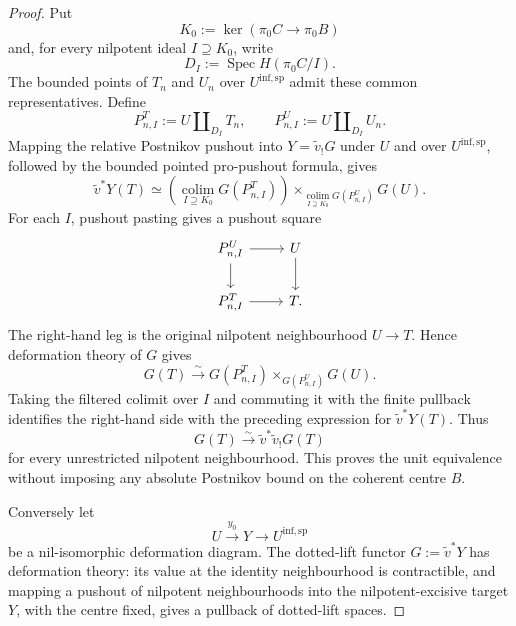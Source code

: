 \begin{proof}
Put
\[
    K_0:=\ker(\pi_0C\to\pi_0B)
\]
and, for every nilpotent ideal
$I\supseteq K_0$, write
\[
    D_I:=\operatorname{Spec}H(\pi_0C/I).
\]
The bounded points of $T_n$ and $U_n$ over $U^{\mathrm{inf,sp}}$ admit these
common representatives.  Define
\[
    P^T_{n,I}:=U\amalg_{D_I}T_n,
    \qquad
    P^U_{n,I}:=U\amalg_{D_I}U_n.
\]
Mapping the relative Postnikov pushout into $Y=\widetilde v_!G$ under $U$
and over $U^{\mathrm{inf,sp}}$, followed by the bounded pointed
pro-pushout formula, gives
\[
\widetilde v^*Y(T)
\simeq
\left(
  \operatorname*{colim}_{I\supseteq K_0}G(P^T_{n,I})
\right)
\times_{
  \operatorname*{colim}_{I\supseteq K_0}G(P^U_{n,I})
}
G(U).
\]
For each $I$, pushout pasting gives a pushout square
\[
\begin{tikzcd}
P^U_{n,I} \arrow[r] \arrow[d] &
U \arrow[d]\\
P^T_{n,I} \arrow[r] &
T.
\end{tikzcd}
\]
The right-hand leg is the original nilpotent neighbourhood
$U\to T$.  Hence deformation theory of $G$ gives
\[
    G(T)
    \xrightarrow{\sim}
    G(P^T_{n,I})
    \times_{G(P^U_{n,I})}
    G(U).
\]
Taking the filtered colimit over $I$ and commuting it with the finite
pullback identifies the right-hand side with the preceding expression for
$\widetilde v^*Y(T)$.  Thus
\[
\boxed{
    G(T)
    \xrightarrow{\sim}
    \widetilde v^*\widetilde v_!G(T)}
\]
for every unrestricted nilpotent neighbourhood.  This proves the unit
equivalence without imposing any absolute Postnikov bound on the coherent
centre $B$.

Conversely let
\[
    U\xrightarrow{y_0}Y\longrightarrow U^{\mathrm{inf,sp}}
\]
be a nil-isomorphic deformation diagram.  The dotted-lift functor
$G:=\widetilde v^*Y$ has deformation theory: its value at the identity
neighbourhood is contractible, and mapping a pushout of nilpotent
neighbourhoods into the nilpotent-excisive target $Y$, with the centre fixed,
gives a pullback of dotted-lift spaces.


\end{proof}
